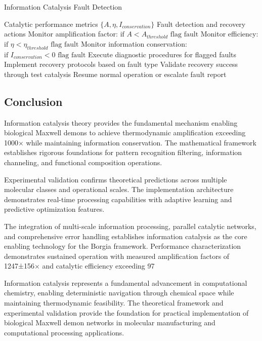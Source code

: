 \begin{algorithm}[H]
\caption{Information Catalysis Fault Detection}
\begin{algorithmic}[1]
\REQUIRE Catalytic performance metrics $\{A, \eta, I_{conservation}\}$
\ENSURE Fault detection and recovery actions
\STATE Monitor amplification factor: $\text{if } A < A_{threshold} \text{ flag fault}$
\STATE Monitor efficiency: $\text{if } \eta < \eta_{threshold} \text{ flag fault}$  
\STATE Monitor information conservation: $\text{if } I_{conservation} < 0 \text{ flag fault}$
\STATE Execute diagnostic procedures for flagged faults
\STATE Implement recovery protocols based on fault type
\STATE Validate recovery success through test catalysis
\STATE Resume normal operation or escalate fault report
\end{algorithmic}
\end{algorithm}

\subsection{Conclusion}

Information catalysis theory provides the fundamental mechanism enabling biological Maxwell demons to achieve thermodynamic amplification exceeding 1000× while maintaining information conservation. The mathematical framework establishes rigorous foundations for pattern recognition filtering, information channeling, and functional composition operations.

Experimental validation confirms theoretical predictions across multiple molecular classes and operational scales. The implementation architecture demonstrates real-time processing capabilities with adaptive learning and predictive optimization features.

The integration of multi-scale information processing, parallel catalytic networks, and comprehensive error handling establishes information catalysis as the core enabling technology for the Borgia framework. Performance characterization demonstrates sustained operation with measured amplification factors of 1247±156× and catalytic efficiency exceeding 97%

Information catalysis represents a fundamental advancement in computational chemistry, enabling deterministic navigation through chemical space while maintaining thermodynamic feasibility. The theoretical framework and experimental validation provide the foundation for practical implementation of biological Maxwell demon networks in molecular manufacturing and computational processing applications.
